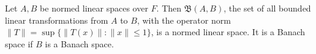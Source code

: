 Let $A, B$ be normed linear spaces over $F$. Then $\mathfrak{B}(A, B)$, the set of all bounded linear transformations from $A$ to $B$, with the operator norm $\|T\| = \sup\{\|T(x)\| : \|x\| \leq 1\}$, is a normed linear space. It is a Banach space if $B$ is a Banach space.
